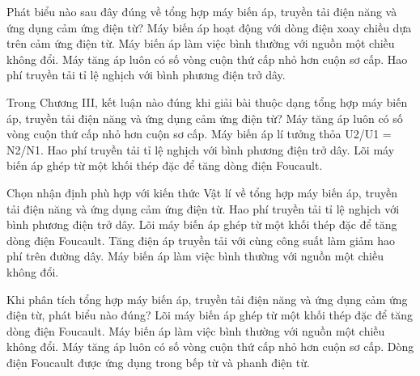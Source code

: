 \begin{ex}
Phát biểu nào sau đây đúng về tổng hợp máy biến áp, truyền tải điện năng và ứng dụng cảm ứng điện từ?
\choice
{\True Máy biến áp hoạt động với dòng điện xoay chiều dựa trên cảm ứng điện từ.}
{Máy biến áp làm việc bình thường với nguồn một chiều không đổi.}
{Máy tăng áp luôn có số vòng cuộn thứ cấp nhỏ hơn cuộn sơ cấp.}
{Hao phí truyền tải tỉ lệ nghịch với bình phương điện trở dây.}
\end{ex}

\begin{ex}
Trong Chương III, kết luận nào đúng khi giải bài thuộc dạng tổng hợp máy biến áp, truyền tải điện năng và ứng dụng cảm ứng điện từ?
\choice
{Máy tăng áp luôn có số vòng cuộn thứ cấp nhỏ hơn cuộn sơ cấp.}
{\True Máy biến áp lí tưởng thỏa U2/U1 = N2/N1.}
{Hao phí truyền tải tỉ lệ nghịch với bình phương điện trở dây.}
{Lõi máy biến áp ghép từ một khối thép đặc để tăng dòng điện Foucault.}
\end{ex}

\begin{ex}
Chọn nhận định phù hợp với kiến thức Vật lí về tổng hợp máy biến áp, truyền tải điện năng và ứng dụng cảm ứng điện từ.
\choice
{Hao phí truyền tải tỉ lệ nghịch với bình phương điện trở dây.}
{Lõi máy biến áp ghép từ một khối thép đặc để tăng dòng điện Foucault.}
{\True Tăng điện áp truyền tải với cùng công suất làm giảm hao phí trên đường dây.}
{Máy biến áp làm việc bình thường với nguồn một chiều không đổi.}
\end{ex}

\begin{ex}
Khi phân tích tổng hợp máy biến áp, truyền tải điện năng và ứng dụng cảm ứng điện từ, phát biểu nào đúng?
\choice
{Lõi máy biến áp ghép từ một khối thép đặc để tăng dòng điện Foucault.}
{Máy biến áp làm việc bình thường với nguồn một chiều không đổi.}
{Máy tăng áp luôn có số vòng cuộn thứ cấp nhỏ hơn cuộn sơ cấp.}
{\True Dòng điện Foucault được ứng dụng trong bếp từ và phanh điện từ.}
\end{ex}

